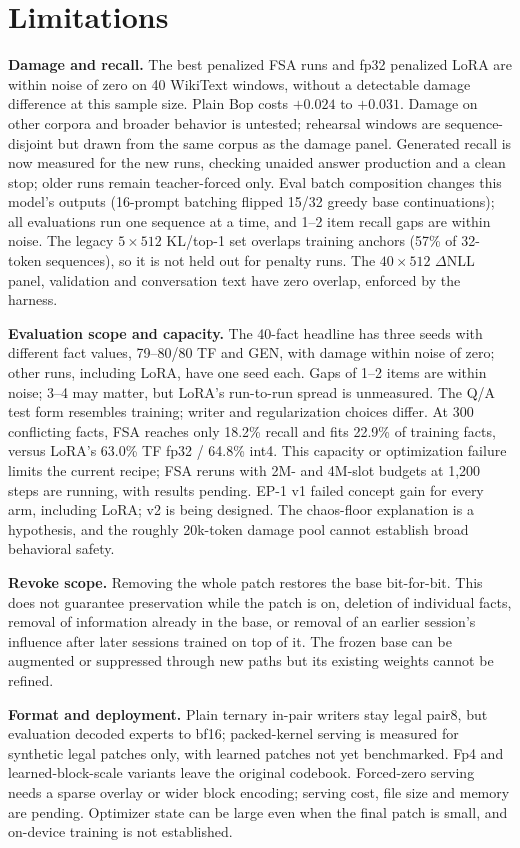 \documentclass[11pt]{article}
\begin{document}
\section{Limitations}
\label{sec:limits}
\textbf{Damage and recall.} The best penalized FSA runs and fp32 penalized LoRA are within noise of
zero on 40 WikiText windows, without a detectable damage difference at this sample size.
Plain Bop costs $+0.024$ to $+0.031$. Damage on other corpora and broader behavior is untested;
rehearsal windows are sequence-disjoint but drawn from the same corpus as the damage panel.
Generated recall is now measured for the new runs, checking unaided answer production and a clean
stop; older runs remain teacher-forced only. Eval batch composition changes this model's outputs
(16-prompt batching flipped 15/32 greedy base continuations); all evaluations run one sequence at
a time, and 1--2 item recall gaps are within noise. The legacy $5\!\times\!512$ KL/top-1 set
overlaps training anchors (57\% of 32-token sequences), so it is not held out for penalty runs.
The $40\!\times\!512$ $\Delta$NLL panel, validation and conversation text have zero overlap,
enforced by the harness.

\textbf{Evaluation scope and capacity.} The 40-fact headline has three seeds with different fact values, 79--80/80 TF and GEN,
with damage within noise of zero; other runs, including LoRA, have one seed each. Gaps of 1--2 items
are within noise; 3--4 may matter, but LoRA's run-to-run spread is unmeasured. The Q/A test form resembles training;
writer and regularization choices differ. At 300 conflicting facts, FSA reaches only 18.2\% recall
and fits 22.9\% of training facts, versus LoRA's 63.0\% TF fp32 / 64.8\% int4. This
capacity or optimization failure limits the current recipe; FSA reruns with 2M- and 4M-slot budgets
at 1,200 steps are running, with results pending.
EP-1 v1 failed concept gain for every arm, including LoRA; v2 is being designed. The chaos-floor
explanation is a hypothesis, and the roughly 20k-token damage pool cannot establish broad behavioral safety.

\textbf{Revoke scope.} Removing the whole patch restores the base bit-for-bit. This does not guarantee
preservation while the patch is on, deletion of individual facts, removal of information already in
the base, or removal of an earlier session's influence after later sessions trained on top of it.
The frozen base can be augmented or suppressed through new paths but its existing weights cannot
be refined.

\textbf{Format and deployment.} Plain ternary in-pair writers stay legal pair8, but evaluation decoded experts
to bf16; packed-kernel serving is measured for synthetic legal patches only, with learned patches
not yet benchmarked. Fp4 and learned-block-scale variants leave the
original codebook. Forced-zero serving needs a sparse overlay or wider block encoding; serving cost,
file size and memory are pending. Optimizer state can be large even when the final patch is small, and on-device
training is not established.
\end{document}
